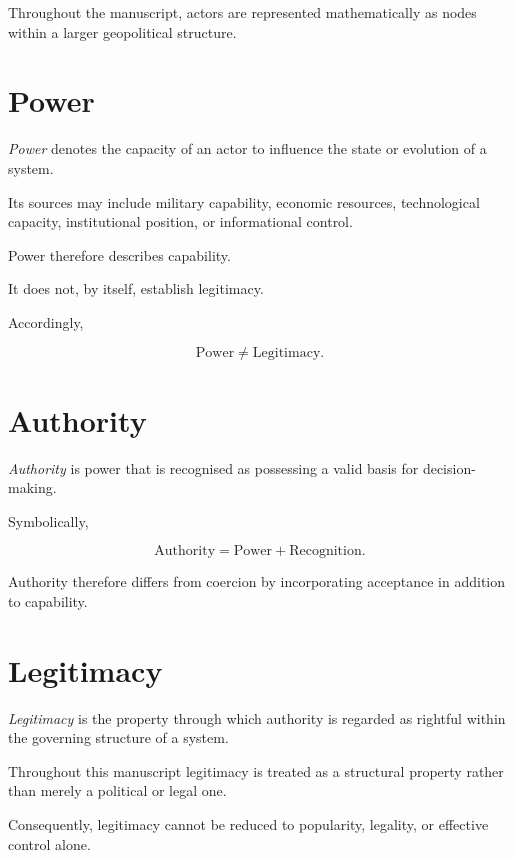 \documentclass[11pt,openany]{book}
\theoremstyle{plain}
\theoremstyle{definition}
\begin{document}
Throughout the manuscript, actors are represented mathematically as nodes within a larger geopolitical structure.


\section*{Power}

\emph{Power} denotes the capacity of an actor to influence the state or evolution of a system.

Its sources may include military capability, economic resources, technological capacity, institutional position, or informational control.

Power therefore describes capability.

It does not, by itself, establish legitimacy.

Accordingly,

\[
\boxed{
\text{Power}
\neq
\text{Legitimacy}.
}
\]


\section*{Authority}

\emph{Authority} is power that is recognised as possessing a valid basis for decision-making.

Symbolically,

\[
\boxed{
\text{Authority}
=
\text{Power}
+
\text{Recognition}.
}
\]

Authority therefore differs from coercion by incorporating acceptance in addition to capability.


\section*{Legitimacy}

\emph{Legitimacy} is the property through which authority is regarded as rightful within the governing structure of a system.

Throughout this manuscript legitimacy is treated as a structural property rather than merely a political or legal one.

Consequently, legitimacy cannot be reduced to popularity, legality, or effective control alone.
\end{document}
